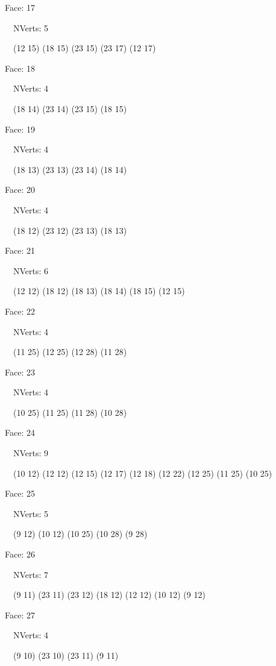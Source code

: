\documentclass{article}
\begin{document}
{\footnotesize 

Face: 17

\   \    NVerts: 5

 \   \   (12 15) (18 15) (23 15) (23 17) (12 17)}

{\footnotesize 

Face: 18

\   \    NVerts: 4

 \   \   (18 14) (23 14) (23 15) (18 15)}

{\footnotesize 

Face: 19

\   \    NVerts: 4

 \   \   (18 13) (23 13) (23 14) (18 14)}

{\footnotesize 

Face: 20

\   \    NVerts: 4

 \   \   (18 12) (23 12) (23 13) (18 13)}

{\footnotesize 

Face: 21

\   \    NVerts: 6

 \   \   (12 12) (18 12) (18 13) (18 14) (18 15) (12 15)}

{\footnotesize 

Face: 22

\   \    NVerts: 4

 \   \   (11 25) (12 25) (12 28) (11 28)}

{\footnotesize 

Face: 23

\   \    NVerts: 4

 \   \   (10 25) (11 25) (11 28) (10 28)}

{\footnotesize 

Face: 24

\   \    NVerts: 9

 \   \   (10 12) (12 12) (12 15) (12 17) (12 18) (12 22) (12 25) (11 25) (10 25)}

{\footnotesize 

Face: 25

\   \    NVerts: 5

 \   \   (9 12) (10 12) (10 25) (10 28) (9 28)}

{\footnotesize 

Face: 26

\   \    NVerts: 7

 \   \   (9 11) (23 11) (23 12) (18 12) (12 12) (10 12) (9 12)}

{\footnotesize 

Face: 27

\   \    NVerts: 4

 \   \   (9 10) (23 10) (23 11) (9 11)}
\end{document}
